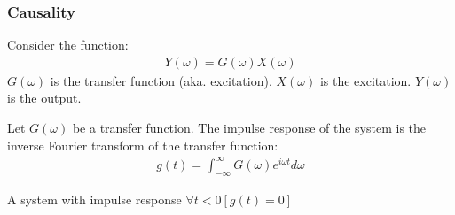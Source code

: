 \documentclass[12pt, english]{book}
\begin{document}
	\subsubsection{Causality} \label{Causality Subsubsection - Complex}
	
	\begin{definition}
		 \label{System Function}
		\label{Transfer Function Definition - Complex}
		Consider the function:
		\begin{align*}
			Y(\omega) = G(\omega) X(\omega)
		\end{align*}
		\(G(\omega)\) is the transfer function (aka. excitation). \(X(\omega)\) is the excitation. \(Y(\omega)\) is the output.
	\end{definition}

	\begin{definition}
		 
		Let \(G(\omega)\) be a transfer function. The impulse response of the system is the inverse Fourier transform of the transfer function:
		\begin{align*}
			g(t)= \int_{-\infty}^{\infty} G(\omega) e^{i\omega t} d\omega
		\end{align*}
	\end{definition}

	\begin{definition}
		\label{Causal System}
		A system with impulse response \(\forall t < 0 [g(t) = 0]\)
	\end{definition}
\end{document}
